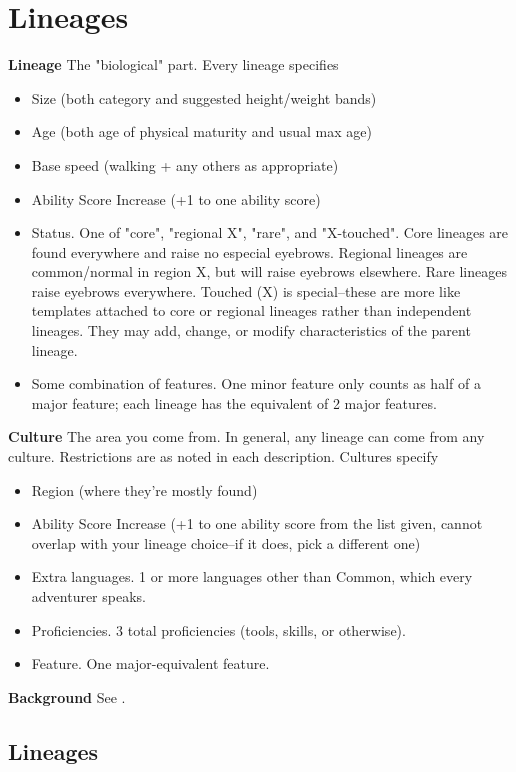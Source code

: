 \chapter{Lineages}\label{ch:lineages} 
\textbf{Lineage} The "biological" part. Every lineage specifies

\begin{itemize}
\item Size (both category and suggested height/weight bands)
\item Age (both age of physical maturity and usual max age)
\item Base speed (walking + any others as appropriate)
\item Ability Score Increase (+1 to one ability score)
\item Status. One of "core", "regional X", "rare", and "X-touched". Core lineages are found everywhere and raise no especial eyebrows. Regional lineages are common/normal in region X, but will raise eyebrows elsewhere. Rare lineages raise eyebrows everywhere. Touched (X) is special--these are more like templates attached to core or regional lineages rather than independent lineages. They may add, change, or modify characteristics of the parent lineage.
\item Some combination of features. One minor feature only counts as half of a major feature; each lineage has the equivalent of 2 major features.
\end{itemize}

\textbf{Culture} The area you come from. In general, any lineage can come from any culture. Restrictions are as noted in each description. Cultures specify
\begin{itemize}
\item Region (where they're mostly found)
\item Ability Score Increase (+1 to one ability score from the list given, cannot overlap with your lineage choice--if it does, pick a different one)
\item Extra languages. 1 or more languages other than Common, which every adventurer speaks.
\item Proficiencies. 3 total proficiencies (tools, skills, or otherwise).
\item Feature. One major-equivalent feature.
\end{itemize}
\textbf{Background} See .

\section{Lineages}
